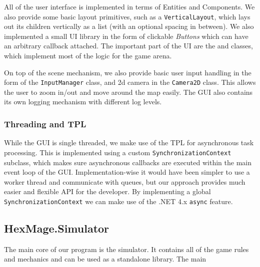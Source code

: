 All of the user interface is implemented in terms of Entities and Components. We also provide some basic layout primitives, such as a \verb|VerticalLayout|, which lays out its children vertically as a list (with an optional spacing in between). We also implemented a small UI library in the form of clickable \emph{Buttons} which can have an arbitrary callback attached. The important part of the UI are the  and  classes, which implement most of the logic for the game arena.

On top of the scene mechanism, we also provide basic user input handling in the form of the \verb|InputManager| class, and 2d camera in the \verb|Camera2D| class. This allows the user to zoom in/out and move around the map easily. The GUI also contains its own logging mechanism with different log levels.

\subsubsection{Threading and TPL}
\label{threading-tpl}

While the GUI is single threaded, we make use of the TPL for asynchronous task processing. This is implemented using a custom \verb|SynchronizationContext| subclass, which makes sure asynchronous callbacks are executed within the main event loop of the GUI. Implementation-wise it would have been simpler to use a worker thread and communicate with queues, but our approach provides much easier and flexible API for the developer. By implementing a global \verb|SynchronizationContext| we can make use of the .NET 4.x \verb|async| \citep{async} feature. 


\subsection{HexMage.Simulator}

The main core of our program is the simulator. It contains all of the game rules and mechanics and can be used as a standalone library. The main 